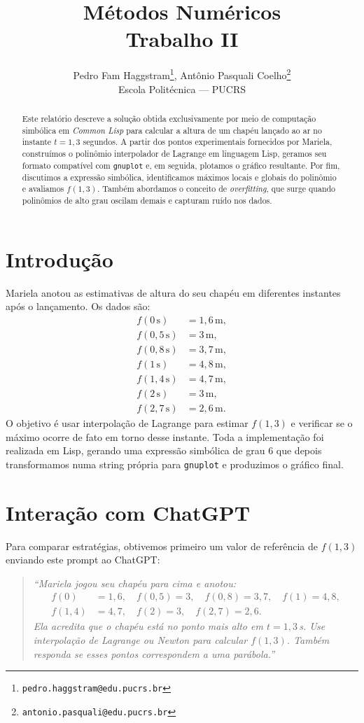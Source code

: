 \documentclass{article}
\title{Métodos Numéricos\\Trabalho II}
\author{Pedro Fam Haggstram\thanks{\texttt{pedro.haggstram@edu.pucrs.br}}, Antônio Pasquali Coelho\thanks{\texttt{antonio.pasquali@edu.pucrs.br}}\\
Escola Politécnica — PUCRS}
\begin{document}
\maketitle

\begin{abstract}
Este relatório descreve a solução obtida exclusivamente por meio de computação simbólica em \textit{Common Lisp} para calcular a altura de um chapéu lançado ao ar no instante $t = 1{,}3$ segundos. A partir dos pontos experimentais fornecidos por Mariela, construímos o polinômio interpolador de Lagrange em linguagem Lisp, geramos seu formato compatível com \texttt{gnuplot} e, em seguida, plotamos o gráfico resultante. Por fim, discutimos a expressão simbólica, identificamos máximos locais e globais do polinômio e avaliamos $f(1{,}3)$. Também abordamos o conceito de \emph{overfitting}, que surge quando polinômios de alto grau oscilam demais e capturam ruído nos dados.
\end{abstract}

\section{Introdução}
Mariela anotou as estimativas de altura do seu chapéu em diferentes instantes após o lançamento. Os dados são:
\[
\begin{aligned}
f(0\,\text{s}) &= 1{,}6\,\text{m},\\
f(0{,}5\,\text{s}) &= 3\,\text{m},\\
f(0{,}8\,\text{s}) &= 3{,}7\,\text{m},\\
f(1\,\text{s})   &= 4{,}8\,\text{m},\\
f(1{,}4\,\text{s}) &= 4{,}7\,\text{m},\\
f(2\,\text{s})   &= 3\,\text{m},\\
f(2{,}7\,\text{s}) &= 2{,}6\,\text{m}.
\end{aligned}
\]
O objetivo é usar interpolação de Lagrange para estimar $f(1{,}3)$ e verificar se o máximo ocorre de fato em torno desse instante. Toda a implementação foi realizada em Lisp, gerando uma expressão simbólica de grau 6 que depois transformamos numa string própria para \texttt{gnuplot} e produzimos o gráfico final.

\section{Interação com ChatGPT}
Para comparar estratégias, obtivemos primeiro um valor de referência de $f(1{,}3)$ enviando este prompt ao ChatGPT:
\begin{quote}
\textit{“Mariela jogou seu chapéu para cima e anotou:
\[
\begin{aligned}
f(0)&=1{,}6,\quad f(0{,}5)=3,\quad f(0{,}8)=3{,}7,\quad f(1)=4{,}8,\\
f(1{,}4)&=4{,}7,\quad f(2)=3,\quad f(2{,}7)=2{,}6.
\end{aligned}
\]
Ela acredita que o chapéu está no ponto mais alto em $t=1{,}3$\,s. Use interpolação de Lagrange ou Newton para calcular $f(1{,}3)$. Também responda se esses pontos correspondem a uma parábola.”}
\end{quote}
\end{document}
